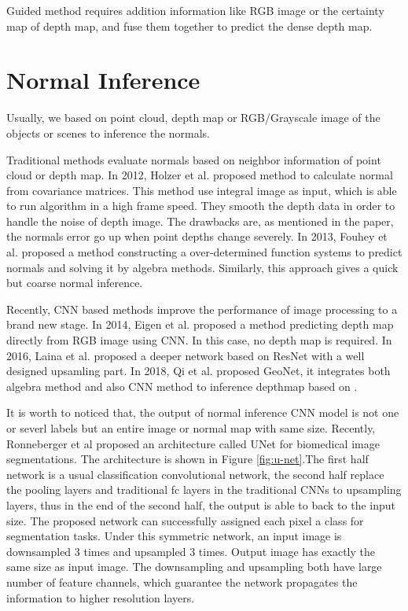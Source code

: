 Guided method \cite{guided} requires addition information like RGB image or the certainty map of depth map, and fuse them together to predict the dense depth map.




\section{Normal Inference}

Usually, we based on point cloud, depth map or RGB/Grayscale image of the objects or scenes to inference the normals. 

Traditional methods evaluate normals based on neighbor information of point cloud or depth map.
In 2012, Holzer et al. \cite{Holzer.S} proposed method to calculate normal from covariance matrices. 
This method use integral image as input, which is able to run algorithm in a high frame speed. They smooth the depth data in order to handle the noise of depth image. The drawbacks are, as mentioned in the paper, the normals error go up when point depths change severely. In 2013, Fouhey et al. \cite{geometry_based_solution} proposed a method constructing a over-determined function systems to predict normals and solving it 
by algebra methods. Similarly, this approach gives a quick but coarse normal inference. 


Recently, CNN based methods improve the performance of image processing to a brand new stage. In 2014, Eigen et al.\cite{Eigen} proposed a method predicting depth map directly from RGB image using CNN. In this case, no depth map is required. In 2016, Laina et al. \cite{img2depth} proposed a deeper network based on ResNet \cite{resnet} with a well designed upsamling part. 
In 2018, Qi et al. proposed GeoNet\cite{GeoNet}, it integrates both algebra method and also CNN method to inference depthmap based on \cite{img2depth} \cite{geometry_based_solution}. 

It is worth to noticed that, the output of normal inference CNN model is not one or severl labels but an entire image or normal map with same size. 
Recently, Ronneberger et al proposed an architecture called UNet \cite{unet} for biomedical image segmentations. The architecture is shown in Figure \ref{fig:u-net}.The first half network is a usual classification convolutional network, the second half replace the pooling layers and traditional fc layers in the traditional CNNs to upsampling layers, thus in the end of the second half, the output is able to back to the input size. The proposed network can successfully assigned each pixel a class for segmentation tasks. Under this symmetric network, an input image is downsampled 3 times and upsampled 3 times. Output image has exactly the same size as input image. The downsampling and upsampling both have large number of feature channels, which guarantee the network propagates the information to higher resolution layers.


